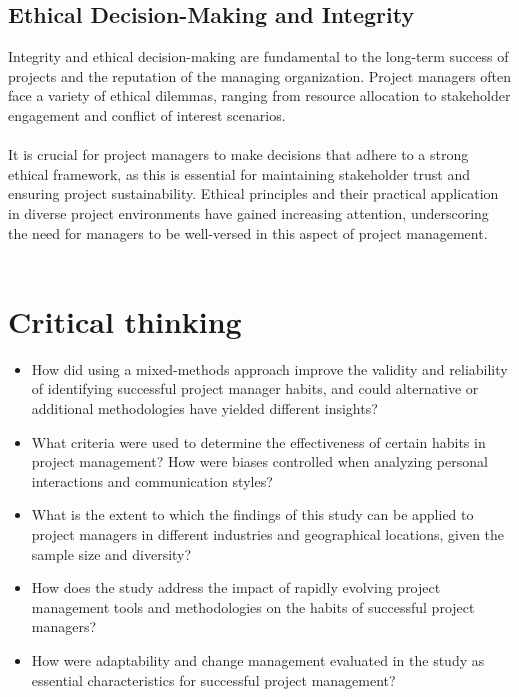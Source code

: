 \documentclass{article}
\begin{document}
\subsection{Ethical Decision-Making and Integrity}
Integrity and ethical decision-making are fundamental to the long-term success of projects and the reputation of the managing organization. Project managers often face a variety of ethical dilemmas, ranging from resource allocation to stakeholder engagement and conflict of interest scenarios. \\\\It is crucial for project managers to make decisions that adhere to a strong ethical framework, as this is essential for maintaining stakeholder trust and ensuring project sustainability. Ethical principles and their practical application in diverse project environments have gained increasing attention, underscoring the need for managers to be well-versed in this aspect of project management\cite{Project_Management_Techniques}.\\\\

\section{Critical thinking}
\begin{itemize}
\item How did using a mixed-methods approach improve the validity and reliability of identifying successful project manager habits, and could alternative or additional methodologies have yielded different insights?
\item What criteria were used to determine the effectiveness of certain habits in project management? How were biases controlled when analyzing personal interactions and communication styles?
\item What is the extent to which the findings of this study can be applied to project managers in different industries and geographical locations, given the sample size and diversity?
\item How does the study address the impact of rapidly evolving project management tools and methodologies on the habits of successful project managers?
    \item How were adaptability and change management evaluated in the study as essential characteristics for successful project management?\\\\
\end{itemize}
\end{document}
